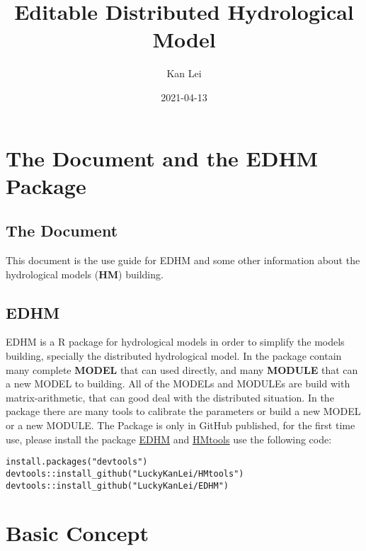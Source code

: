 \documentclass[
]{book}
\title{Editable Distributed Hydrological Model}
\author{Kan Lei}
\date{2021-04-13}
\begin{document}
\maketitle

{
\setcounter{tocdepth}{1}
\tableofcontents
}
\hypertarget{the-document-and-the-edhm-package}{%
\chapter*{The Document and the EDHM Package}\label{the-document-and-the-edhm-package}}

\hypertarget{the-document}{%
\section*{The Document}\label{the-document}}

This document is the use guide for EDHM and some other information about the hydrological models (\textbf{HM}) building.

\hypertarget{edhm}{%
\section*{EDHM}\label{edhm}}

EDHM is a R package for hydrological models in order to simplify the models building, specially the distributed hydrological model. In the package contain many complete \textbf{MODEL} that can used directly, and many \textbf{MODULE} that can a new MODEL to building. All of the MODELs and MODULEs are build with matrix-arithmetic, that can good deal with the distributed situation. In the package there are many tools to calibrate the parameters or build a new MODEL or a new MODULE. The Package is only in GitHub published, for the first time use, please install the package \href{https://github.com/LuckyKanLei/EDHM}{EDHM} and \href{https://github.com/LuckyKanLei/HMtools}{HMtools} use the following code:

\begin{verbatim}
install.packages("devtools")
devtools::install_github("LuckyKanLei/HMtools")
devtools::install_github("LuckyKanLei/EDHM")
\end{verbatim}

\hypertarget{base}{%
\chapter{Basic Concept}\label{base}}
\end{document}
